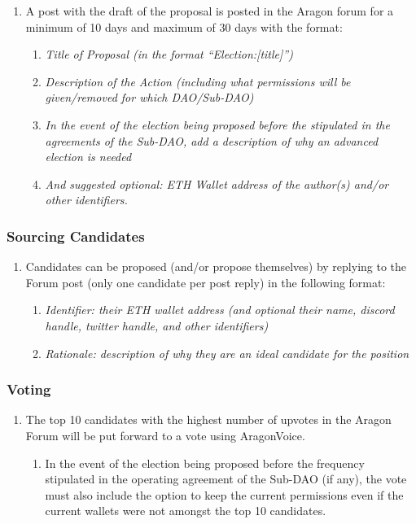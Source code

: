 \begin{enumerate}
	\item A post with the draft of the proposal is posted in the Aragon forum for a minimum of 10 days and maximum of 30 days with the format:
	\begin{enumerate}
		\item \textit{Title of Proposal (in the format “Election:[title]”)}
		\item \textit{Description of the Action (including what permissions will be given/removed for which \ac{DAO}/Sub-\ac{DAO})}
		\item \textit{In the event of the election being proposed before the stipulated in the agreements of the Sub-\ac{DAO}, add a description of why an advanced election is needed}
		\item \textit{And suggested optional: ETH Wallet address of the author(s) and/or other identifiers.}
	\end{enumerate}
\end{enumerate}

\subsubsection*{Sourcing Candidates}

\begin{enumerate}
	\item Candidates can be proposed (and/or propose themselves) by replying to the Forum post (only one candidate per post reply) in the following format:
	\begin{enumerate}
		\item \textit{Identifier: their ETH wallet address (and optional their name, discord handle, twitter handle, and other identifiers)}
		\item \textit{Rationale: description of why they are an ideal candidate for the position}
	\end{enumerate}
\end{enumerate}


\subsubsection*{Voting}
\begin{enumerate}
	\item The top 10 candidates with the highest number of upvotes in the Aragon Forum will be put forward to a vote using \gls{AragonVoice}.
	\begin{enumerate}
		\item In the event of the election being proposed before the frequency stipulated in the operating agreement of the Sub-\ac{DAO} (if any), the vote must also include the option to keep the current permissions even if the current wallets were not amongst the top 10 candidates.
	\end{enumerate}
\end{enumerate}

